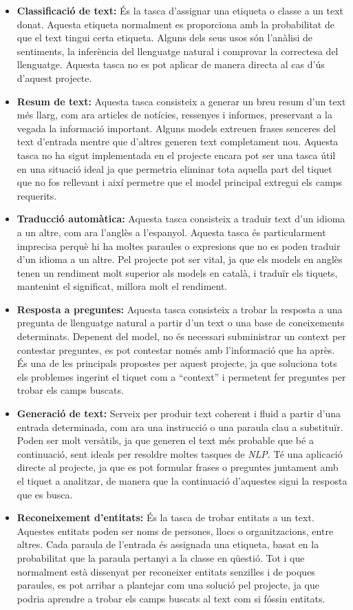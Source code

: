 \begin{itemize}
    \item \textbf{Classificació de text:} És la tasca d'assignar una etiqueta o classe a un text donat. Aquesta etiqueta normalment es proporciona amb la probabilitat de que el text tingui certa etiqueta. Alguns dels seus usos són l'anàlisi de sentiments, la inferència del llenguatge natural i comprovar la correctesa del llenguatge. Aquesta tasca no es pot aplicar de manera directa al cas d'ús d'aquest projecte.
    \item \textbf{Resum de text:} Aquesta tasca consisteix a generar un breu resum d'un text més llarg, com ara articles de notícies, ressenyes i informes, preservant a la vegada la informació important. Alguns models extreuen frases senceres del text d'entrada mentre que d'altres generen text completament nou. Aquesta tasca no ha sigut implementada en el projecte encara pot ser una tasca útil en una situació ideal ja que permetria eliminar tota aquella part del tiquet que no fos rellevant i així permetre que el model principal extregui els camps requerits.
    \item \textbf{Traducció automàtica:} Aquesta tasca consisteix a traduir text d'un idioma a un altre, com ara l'anglès a l'espanyol. Aquesta tasca és particularment imprecisa perquè hi ha moltes paraules o expresions que no es poden traduir d'un idioma a un altre. Pel projecte pot ser vital, ja que els models en anglès tenen un rendiment molt superior als models en català, i traduïr els tiquets, mantenint el significat, millora molt el rendiment.
    \item \textbf{Resposta a preguntes:} Aquesta tasca consisteix a trobar la resposta a una pregunta de llenguatge natural a partir d'un text o una base de coneixements determinats. Depenent del model, no és necessari subministrar un context per contestar preguntes, es pot contestar només amb l'informació que ha après. És una de les principals propostes per aquest projecte, ja que soluciona tots els problemes ingerint el tiquet com a ``context'' i permetent fer preguntes per trobar els camps buscats.
    \item \textbf{Generació de text:} Serveix per produir text coherent i fluid a partir d'una entrada determinada, com ara una instrucció o una paraula clau a substituïr. Poden ser molt versàtils, ja que generen el text més probable que bé a continuació, sent ideals per resoldre moltes tasques de \textit{NLP}. Té una aplicació directe al projecte, ja que es pot formular frases o preguntes juntament amb el tiquet a analitzar, de manera que la continuació d'aquestes sigui la resposta que es busca.
    \item \textbf{Reconeixement d'entitats:} És la tasca de trobar entitats a un text. Aquestes entitats poden ser noms de persones, llocs o organitzacions, entre altres. Cada paraula de l'entrada és assignada una etiqueta, basat en la probabilitat que la paraula pertanyi a la classe en qüestió. Tot i que normalment està dissenyat per reconeixer entitats senzilles i de poques paraules, es pot arribar a plantejar com una solució pel projecte, ja que podria aprendre a trobar els camps buscats al text com si fóssin entitats.
\end{itemize}
